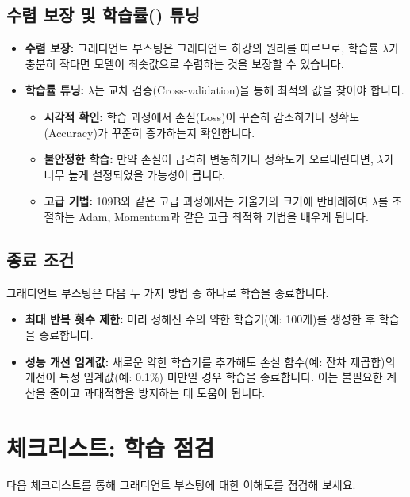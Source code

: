 \documentclass[11pt,a4paper]{article}
\theoremstyle{definition}
\begin{document}
\subsection{수렴 보장 및 학습률(\texttt{\lambda}) 튜닝}
\begin{itemize}
    \item \textbf{수렴 보장:} 그래디언트 부스팅은 그래디언트 하강의 원리를 따르므로, 학습률 $\lambda$가 충분히 작다면 모델이 최솟값으로 수렴하는 것을 보장할 수 있습니다.
    \item \textbf{학습률 튜닝:} $\lambda$는 교차 검증(Cross-validation)을 통해 최적의 값을 찾아야 합니다.
        \begin{itemize}
            \item \textbf{시각적 확인:} 학습 과정에서 손실(Loss)이 꾸준히 감소하거나 정확도(Accuracy)가 꾸준히 증가하는지 확인합니다.
            \item \textbf{불안정한 학습:} 만약 손실이 급격히 변동하거나 정확도가 오르내린다면, $\lambda$가 너무 높게 설정되었을 가능성이 큽니다.
            \item \textbf{고급 기법:} 109B와 같은 고급 과정에서는 기울기의 크기에 반비례하여 $\lambda$를 조절하는 Adam, Momentum과 같은 고급 최적화 기법을 배우게 됩니다.
        \end{itemize}
\end{itemize}

\subsection{종료 조건}
그래디언트 부스팅은 다음 두 가지 방법 중 하나로 학습을 종료합니다.
\begin{itemize}
    \item \textbf{최대 반복 횟수 제한:} 미리 정해진 수의 약한 학습기(예: 100개)를 생성한 후 학습을 종료합니다.
    \item \textbf{성능 개선 임계값:} 새로운 약한 학습기를 추가해도 손실 함수(예: 잔차 제곱합)의 개선이 특정 임계값(예: 0.1\%) 미만일 경우 학습을 종료합니다. 이는 불필요한 계산을 줄이고 과대적합을 방지하는 데 도움이 됩니다.
\end{itemize}

\newpage
\section{체크리스트: 학습 점검}
다음 체크리스트를 통해 그래디언트 부스팅에 대한 이해도를 점검해 보세요.
\end{document}

